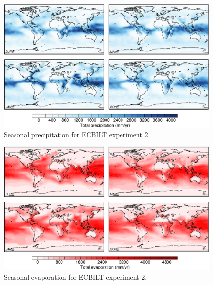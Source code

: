 \documentclass[a4paper,11pt]{article}
\begin{document}
\begin{figure}
  \begin{center}
    \includegraphics[width=\textwidth]{../expt-2/plots/pp-plots}
  \end{center}
  \caption{Seasonal precipitation for ECBILT experiment 2.}
  \label{fig:pp-2}
\end{figure}

\begin{figure}
  \begin{center}
    \includegraphics[width=\textwidth]{../expt-2/plots/evap-plots}
  \end{center}
  \caption{Seasonal evaporation for ECBILT experiment 2.}
  \label{fig:evap-2}
\end{figure}
\end{document}
